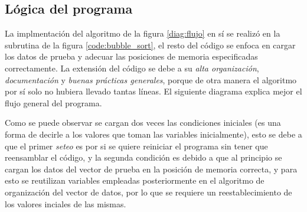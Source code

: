 \documentclass[letterpaper, 10 pt, conference]{ieeeconf}  %
\begin{document}
\subsection{Lógica del programa}
La implmentación del algoritmo de la figura \ref{diag:flujo} en sí se realizó en la subrutina de la figura \ref{code:bubble_sort}, el resto del código se enfoca en cargar los datos de prueba y adecuar las posiciones de memoria especificadas correctamente. La extensión del código se debe a su \textit{alta organización}, \textit{documentación} y \textit{buenas prácticas generales}, porque de otra manera el algoritmo por sí solo no hubiera llevado tantas líneas. El siguiente diagrama explica mejor el flujo general del programa.
\begin{figure}[H]
  \tiny
  \centering
  \label{diag:bloques_gen}
\end{figure}
Como se puede observar se cargan dos veces las condiciones iniciales (es una forma de decirle a los valores que toman las variables inicialmente), esto se debe a que el primer \textit{seteo} es por si se quiere reiniciar el programa sin tener que reensamblar el código, y la segunda condición es debido a que al principio se cargan los datos del vector de prueba en la posición de memoria correcta, y para esto se reutilizan variables empleadas posteriormente en el algoritmo de organización del vector de datos, por lo que se requiere un reestablecimiento de los valores inciales de las mismas.
\end{document}
